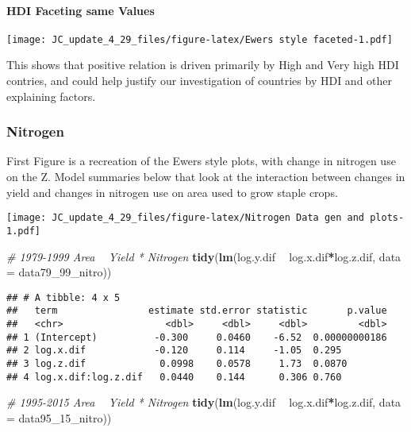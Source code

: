 \documentclass[
]{article}
\newenvironment{Shaded}{\begin{snugshade}}{\end{snugshade}}
\newcommand{\CommentTok}[1]{\textcolor[rgb]{0.56,0.35,0.01}{\textit{#1}}}
\newcommand{\DataTypeTok}[1]{\textcolor[rgb]{0.13,0.29,0.53}{#1}}
\newcommand{\DecValTok}[1]{\textcolor[rgb]{0.00,0.00,0.81}{#1}}
\newcommand{\KeywordTok}[1]{\textcolor[rgb]{0.13,0.29,0.53}{\textbf{#1}}}
\newcommand{\NormalTok}[1]{#1}
\newcommand{\OperatorTok}[1]{\textcolor[rgb]{0.81,0.36,0.00}{\textbf{#1}}}
\newcommand{\StringTok}[1]{\textcolor[rgb]{0.31,0.60,0.02}{#1}}
\begin{document}
\hypertarget{hdi-faceting-same-values}{%
\paragraph{HDI Faceting same Values}\label{hdi-faceting-same-values}}

\texttt{[image: JC\_update\_4\_29\_files/figure-latex/Ewers style faceted-1.pdf]}

This shows that positive relation is driven primarily by High and Very
high HDI contries, and could help justify our investigation of countries
by HDI and other explaining factors.

\hypertarget{nitrogen}{%
\subsubsection{Nitrogen}\label{nitrogen}}

First Figure is a recreation of the Ewers style plots, with change in
nitrogen use on the Z. Model summaries below that look at the
interaction between changes in yield and changes in nitrogen use on area
used to grow staple crops.

\texttt{[image: JC\_update\_4\_29\_files/figure-latex/Nitrogen Data gen and plots-1.pdf]}

\begin{Shaded}
\begin{Highlighting}[]
\CommentTok{# 1979-1999 Area ~ Yield * Nitrogen}
\KeywordTok{tidy}\NormalTok{(}\KeywordTok{lm}\NormalTok{(log.y.dif }\OperatorTok{~}\StringTok{ }\NormalTok{log.x.dif}\OperatorTok{*}\NormalTok{log.z.dif, }\DataTypeTok{data =}\NormalTok{ data79_}\DecValTok{99}\NormalTok{_nitro))}
\end{Highlighting}
\end{Shaded}

\begin{verbatim}
## # A tibble: 4 x 5
##   term                estimate std.error statistic       p.value
##   <chr>                  <dbl>     <dbl>     <dbl>         <dbl>
## 1 (Intercept)          -0.300     0.0460    -6.52  0.00000000186
## 2 log.x.dif            -0.120     0.114     -1.05  0.295        
## 3 log.z.dif             0.0998    0.0578     1.73  0.0870       
## 4 log.x.dif:log.z.dif   0.0440    0.144      0.306 0.760
\end{verbatim}

\begin{Shaded}
\begin{Highlighting}[]
\CommentTok{# 1995-2015 Area ~ Yield * Nitrogen}
\KeywordTok{tidy}\NormalTok{(}\KeywordTok{lm}\NormalTok{(log.y.dif }\OperatorTok{~}\StringTok{ }\NormalTok{log.x.dif}\OperatorTok{*}\NormalTok{log.z.dif, }\DataTypeTok{data =}\NormalTok{ data95_}\DecValTok{15}\NormalTok{_nitro))}
\end{Highlighting}
\end{Shaded}
\end{document}
